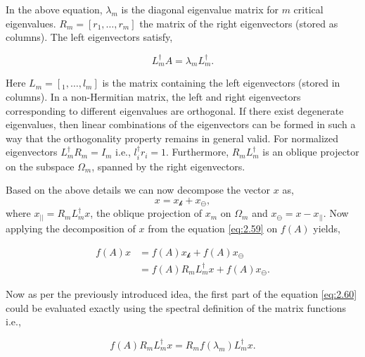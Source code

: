In the above equation, $\lambda_{m}$ is the diagonal eigenvalue matrix for $m$ critical eigenvalues. $R_{m} = [r_{1},\dots,r_{m}]$ the matrix of the right eigenvectors (stored as columns). The left eigenvectors satisfy,

\begin{equation}
    L_{m}^{\dagger}A = \lambda_{m}L_{m}^{\dagger}.
    \label{eq:2.58}
\end{equation}

Here $L_{m} = [_{1},\dots,l_{m}]$ is the matrix containing the left eigenvectors (stored in columns). In a non-Hermitian matrix, the left and right eigenvectors corresponding to different eigenvalues are orthogonal. If there exist degenerate eigenvalues, then linear combinations of the eigenvectors can be formed in such a way that the orthogonality property remains in general valid. For normalized eigenvectors $L_{m}^{\dagger}R_{m}=I_{m}$ i.e., $l_{i}^{\dagger}r_{i}=1$. Furthermore, $R_{m}L_{m}^{\dagger}$ is an oblique projector on the subspace $\Omega_{m}$, spanned by the right eigenvectors.

Based on the above details we can now decompose the vector $x$ as,
\begin{equation}
    x = x_{\mathcal{k}} + x_{\ominus},
    \label{eq:2.59}
\end{equation}
where $x_{||} = R_{m}L_{m}^{\dagger}x$, the oblique projection of $x_{m}$ on $\Omega_{m}$ and $x_{\ominus} = x - x_{||}$. Now applying the decomposition of $x$ from the equation \eqref{eq:2.59} on $f(A)$ yields,

\begin{equation}
\begin{aligned}
    f(A)x &= f(A)x_{\mathcal{k}} + f(A)x_{\ominus} \\
          &= f(A)R_{m}L_{m}^{\dagger}x + f(A)x_{\ominus}.
\end{aligned}
\label{eq:2.60}
\end{equation}

Now as per the previously introduced idea, the first part of the equation \eqref{eq:2.60} could be evaluated exactly using the spectral definition of the matrix functions i.e.,

\begin{equation}
    f(A)R_{m}L_{m}^{\dagger}x = R_{m}f(\lambda_{m})L_{m}^{\dagger}x.
    \label{eq:2.61}
\end{equation}

